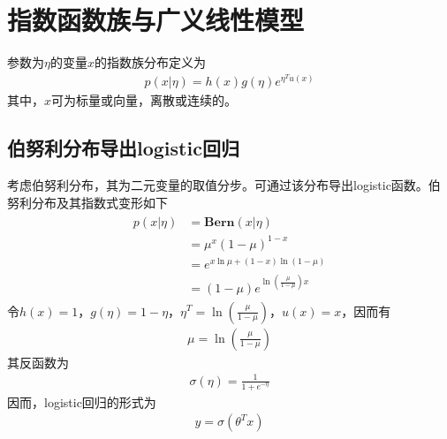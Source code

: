 \section{指数函数族与广义线性模型}
参数为$\eta$的变量$x$的指数族分布定义为
\begin{eqnarray}
p(x|\eta)=h(x)g(\eta)e^{\eta^Tu(x)}
\end{eqnarray}
其中，$x$可为标量或向量，离散或连续的。
\subsection{伯努利分布导出logistic回归}
考虑伯努利分布，其为二元变量的取值分步。可通过该分布导出logistic函数。伯努利分布及其指数式变形如下
\begin{eqnarray}
\begin{aligned}
p(x|\eta)&=\textbf{Bern}(x|\eta)\\
&=\mu^x(1-\mu)^{1-x}\\
&=e^{x\ln\mu+(1-x)\ln(1-\mu)}\\
&=(1-\mu)e^{\ln(\frac{\mu}{1-\mu})x}
\end{aligned}
\end{eqnarray}
令$h(x)=1$，$g(\eta)=1-\eta$，$\eta^T=\ln(\frac{\mu}{1-\mu})$，$u(x)=x$，因而有
\begin{eqnarray}
\mu=\ln(\frac{\mu}{1-\mu})
\end{eqnarray}
其反函数为
\begin{eqnarray}
\sigma(\eta)=\frac{1}{1+e^{-\eta}}
\end{eqnarray}
因而，logistic回归的形式为
\begin{eqnarray}
y=\sigma(\theta^Tx)
\end{eqnarray}

